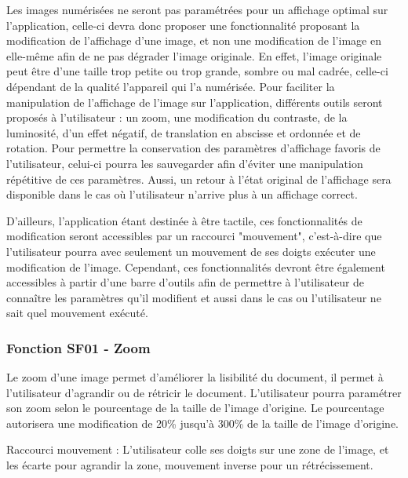 \documentclass[a4paper]{article}
\begin{document}
Les images numérisées ne seront pas paramétrées pour un affichage optimal sur l’application, celle-ci devra donc proposer une fonctionnalité proposant la modification de l’affichage d’une image, et non une modification de l’image en elle-même afin de ne pas dégrader l’image originale. En effet, l’image originale peut être d’une taille trop petite ou trop grande, sombre ou mal cadrée, celle-ci dépendant de la qualité l’appareil qui l’a numérisée. Pour faciliter la manipulation de l’affichage de l’image sur l’application, différents outils seront proposés à l’utilisateur : un zoom, une modification du contraste, de la luminosité, d’un effet négatif, de translation en abscisse et ordonnée et de rotation. Pour permettre la conservation des paramètres d’affichage favoris de l’utilisateur, celui-ci pourra les sauvegarder afin d’éviter une manipulation répétitive de ces paramètres. Aussi, un retour à l’état original de l’affichage sera disponible dans le cas où l’utilisateur n’arrive plus à un affichage correct.

D'ailleurs, l'application étant destinée à être tactile, ces fonctionnalités de modification seront accessibles par un raccourci "mouvement", c'est-à-dire que l'utilisateur pourra avec seulement un mouvement de ses doigts exécuter une modification de l'image. Cependant, ces fonctionnalités devront être également accessibles à partir d'une barre d'outils afin de permettre à l'utilisateur de connaître les paramètres qu'il modifient et aussi dans le cas ou l'utilisateur ne sait quel mouvement exécuté.


\subsubsection{Fonction SF01 - Zoom}

Le zoom d'une image permet d'améliorer la lisibilité du document, il permet à l'utilisateur d'agrandir ou de rétricir le document. L'utilisateur pourra paramétrer son zoom selon le pourcentage de la taille de l'image d'origine. Le pourcentage autorisera une modification de 20\% jusqu'à 300\% de la taille de l'image d'origine.

Raccourci mouvement : L'utilisateur colle ses doigts sur une zone de l'image, et les écarte pour agrandir la zone, mouvement inverse pour un rétrécissement.
\end{document}
